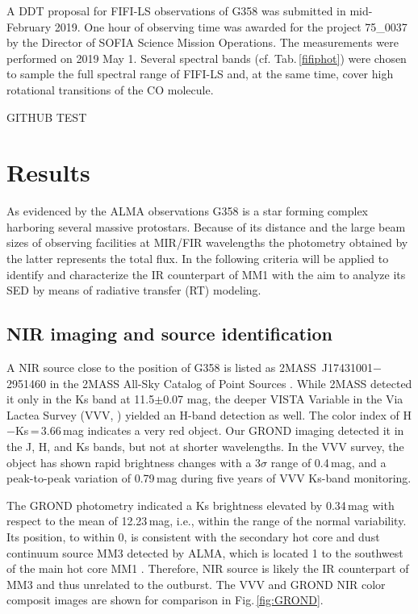 \documentclass[longauth,usenatbib]{aa}
\begin{document}
A DDT proposal for FIFI-LS observations of G358 was submitted in mid-February 2019.
One hour of observing time was awarded for the project 75\_0037 by the Director of SOFIA Science Mission Operations. The measurements were performed on 2019 May 1. Several spectral bands (cf. Tab.\,\ref{fifiphot}) were chosen to sample the full spectral range of FIFI-LS and, at the same time, cover high rotational transitions of the CO molecule.

GITHUB TEST

\section{Results}\label{res}

As evidenced by the ALMA observations G358 is a star forming complex harboring several massive protostars. Because of its distance and the large beam sizes of observing facilities at MIR/FIR wavelengths the photometry obtained by the latter represents the total flux. In the following criteria will be applied to identify and characterize the IR counterpart of MM1 with the aim to analyze its SED by means of radiative transfer (RT) modeling.

\subsection{NIR imaging and source identification}\label{rnir}
A NIR source close to the position of G358 is listed as 2MASS~J17431001$-$2951460 in the 2MASS All-Sky Catalog of Point Sources . While 2MASS detected it only in the Ks band at 11.5$\pm$0.07 mag, the deeper VISTA Variable in the Via Lactea Survey (VVV, ) yielded an H-band detection as well. The color index of H$-$Ks\,=\,3.66\,mag indicates a very red object. Our GROND imaging detected it in the J, H, and Ks bands, but not at shorter wavelengths. In the VVV survey, the object has shown rapid brightness changes with a 3$\sigma$ range of 0.4\,mag, and a peak-to-peak variation of 0.79\,mag during five years of VVV Ks-band monitoring. 

The GROND photometry indicated a Ks brightness elevated by 0.34\,mag with respect to the mean of 12.23\,mag, i.e., within the range of the normal variability. Its position, to within 0, is consistent with the secondary hot core and dust continuum source MM3 detected by ALMA, which is located 1 to the southwest of the main hot core MM1 . Therefore, NIR source is likely the IR counterpart of MM3 and thus unrelated to the outburst. The VVV and GROND NIR color composit images are shown for comparison in Fig.\,\ref{fig:GROND}.
\end{document}

